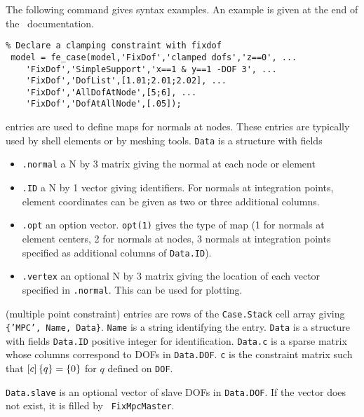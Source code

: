 The following command gives syntax examples. An example is given at the end of the \fecase\ documentation.

\begin{verbatim}
% Declare a clamping constraint with fixdof
 model = fe_case(model,'FixDof','clamped dofs','z==0', ...
    'FixDof','SimpleSupport','x==1 & y==1 -DOF 3', ...
    'FixDof','DofList',[1.01;2.01;2.02], ...
    'FixDof','AllDofAtNode',[5;6], ...
    'FixDof','DofAtAllNode',[.05]);
\end{verbatim}



 entries are used to define maps for normals at nodes. These entries are typically used by shell elements or by meshing tools. {\tt Data} is a structure with fields

\begin{itemize}
 \item {\tt .normal} a N by 3 matrix giving the normal at each node or element
 \item {\tt .ID} a N by 1 vector giving identifiers. For normals at integration points, element coordinates can be given as two or three additional columns.
 \item {\tt .opt} an option vector. {\tt opt(1)} gives the type of map (1 for normals at element centers, 2 for normals at nodes, 3 normals at integration points specified as additional columns of {\tt Data.ID}).
 \item {\tt .vertex} an optional N by 3 matrix giving the location of each vector specified in {\tt .normal}. This can be used for plotting. 
\end{itemize}


 (multiple point constraint) entries are rows of the {\tt Case.Stack} cell array giving {\tt \{'MPC', Name, Data\}}. {\tt Name} is a string identifying the entry. {\tt Data} is a structure with fields {\tt Data.ID} positive integer for identification. {\tt Data.c} is a sparse matrix whose columns correspond to DOFs in {\tt Data.DOF}. {\tt c} is the constraint matrix such that $\left[c\right] \left\{q\right\} = \left\{0\right\}$ for $q$ defined on {\tt DOF}.

{\tt Data.slave} is an optional vector of slave DOFs in {\tt Data.DOF}. If the vector does not exist, it is filled by \feutil\ {\tt FixMpcMaster}.

